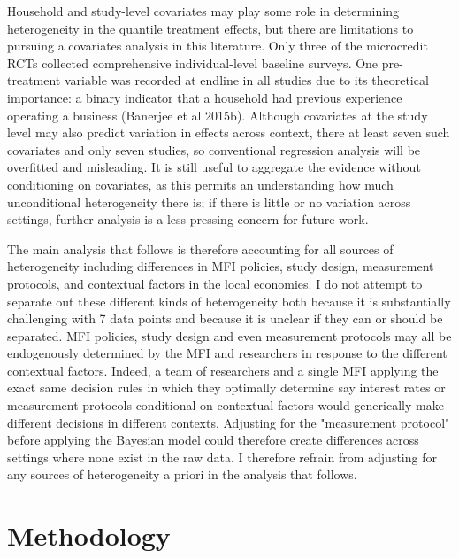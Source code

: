 \documentclass[AER]{AEA}
\begin{document}
Household and study-level covariates may play some role in determining heterogeneity in the quantile treatment effects, but there are limitations to pursuing a covariates analysis in this literature. Only three of the microcredit RCTs collected comprehensive individual-level baseline surveys. One pre-treatment variable was recorded at endline in all studies due to its theoretical importance: a binary indicator that a household had previous experience operating a business (Banerjee et al 2015b). Although covariates at the study level may also predict variation in effects across context, there at least seven such covariates and only seven studies, so conventional regression analysis will be overfitted and misleading. It is still useful to aggregate the evidence without conditioning on covariates, as this permits an understanding how much unconditional heterogeneity there is; if there is little or no variation across settings, further analysis is a less pressing concern for future work.

The main analysis that follows is therefore accounting for all sources of heterogeneity including differences in MFI policies, study design, measurement protocols, and contextual factors in the local economies. I do not attempt to separate out these different kinds of heterogeneity both because it is substantially challenging with 7 data points and because it is unclear if they can or should be separated. MFI policies, study design and even measurement protocols may all be endogenously determined by the MFI and researchers in response to the different contextual factors. Indeed, a team of researchers and a single MFI applying the exact same decision rules in which they optimally determine say interest rates or measurement protocols conditional on contextual factors would generically make different decisions in different contexts. Adjusting for the "measurement protocol" before applying the Bayesian model could therefore create differences across settings where none exist in the raw data. I therefore refrain from adjusting for any sources of heterogeneity a priori in the analysis that follows.

\section{Methodology}\label{methodology}
\end{document}
